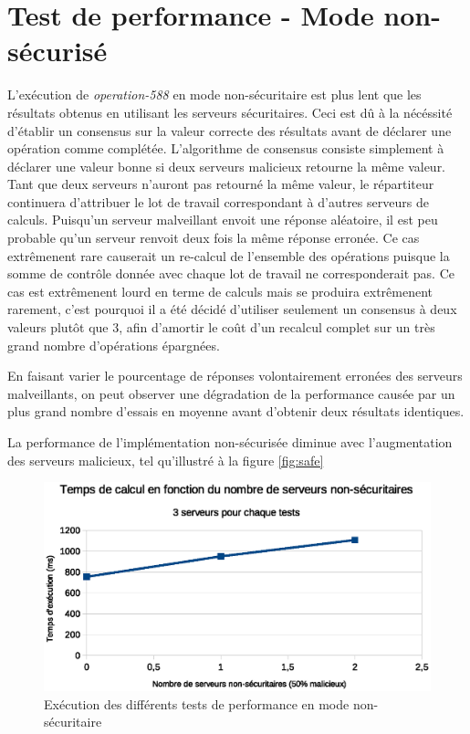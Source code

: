 \section{Test de performance - Mode non-sécurisé}

L'exécution de \emph{operation-588} en mode non-sécuritaire est plus lent que les résultats obtenus en utilisant les serveurs sécuritaires. Ceci est dû à la nécéssité d'établir un consensus sur la valeur correcte des résultats avant de déclarer une opération comme complétée. L'algorithme de consensus consiste simplement à déclarer une valeur bonne si deux serveurs malicieux retourne la même valeur. Tant que deux serveurs n'auront pas retourné la même valeur, le répartiteur continuera d'attribuer le lot de travail correspondant à d'autres serveurs de calculs. Puisqu'un serveur malveillant envoit une réponse aléatoire, il est peu probable qu'un serveur renvoit deux fois la même réponse erronée. Ce cas extrêmenent rare causerait un re-calcul de l'ensemble des opérations puisque la somme de contrôle donnée avec chaque lot de travail ne corresponderait pas. Ce cas est extrêmenent lourd en terme de calculs mais se produira extrêmenent rarement, c'est pourquoi il a été décidé d'utiliser seulement un consensus à deux valeurs plutôt que 3, afin d'amortir le coût d'un recalcul complet sur un très grand nombre d'opérations épargnées.

En faisant varier le pourcentage de réponses volontairement erronées des serveurs malveillants, on peut observer une dégradation de la performance causée par un plus grand nombre d'essais en moyenne avant d'obtenir deux résultats identiques.

La performance de l'implémentation non-sécurisée diminue avec l'augmentation des serveurs malicieux, tel qu'illustré à la figure \ref{fig:safe}

\begin{figure}
  \includegraphics[width=\linewidth]{unsafe_exec.eps}
  \caption{ Exécution des différents tests de performance en mode non-sécuritaire }
  \label{fig:unsafe}
\end{figure}

